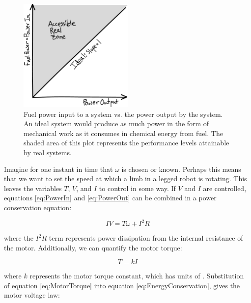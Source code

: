 \begin{figure}[h]		%
\begin{centering}
\includegraphics[width=0.5\textwidth]{Figures/IdealPowerPlotSketch}\par
\end{centering}
\caption[Plot: Power Conservation]{Fuel power input to a system vs. the power output by the system. An ideal system would produce as much power in the form of mechanical work as it consumes in chemical energy from fuel. The shaded area of this plot represents the performance levels attainable by real systems.}
\label{fig:IdealPowerPlotSketch}
\end{figure}

Imagine for one instant in time that $\omega$ is chosen or known. Perhaps this means that we want to set the speed at which a limb in a legged robot is rotating. This leaves the variables $T$, $V$, and $I$ to control in some way. If $V$ and $I$ are controlled, equations \ref{eq:PowerIn} and \ref{eq:PowerOut} can be combined in a power conservation equation:

\begin{equation}
IV = T\omega + I^{2} R
\label{eq:EnergyConservation}
\end{equation}

where the $I^{2}R$ term represents power dissipation from the internal resistance of the motor. Additionally, we can quantify the motor torque:

\begin{equation}
T = kI
\label{eq:MotorTorque}
\end{equation}

where $k$ represents the motor torque constant, which has units of . Substitution of equation \ref{eq:MotorTorque} into equation \ref{eq:EnergyConservation}, gives the motor voltage law:

